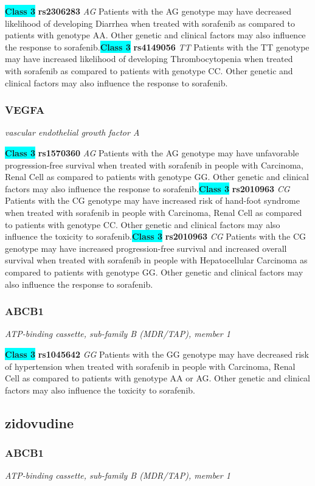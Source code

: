 \documentclass{report}
\begin{document}
\textbf{\colorbox{cyan} {Class 3}} \textbf{ rs2306283 } \textit{ AG }
Patients with the AG genotype may have decreased likelihood of developing Diarrhea when treated with sorafenib as compared to patients with genotype AA. Other genetic and clinical factors may also influence the response to sorafenib.\newline\textbf{\colorbox{cyan} {Class 3}} \textbf{ rs4149056 } \textit{ TT }
Patients with the TT genotype may have increased likelihood of developing Thrombocytopenia when treated with sorafenib as compared to patients with genotype CC. Other genetic and clinical factors may also influence the response to sorafenib.\newline\subsubsection{ VEGFA }
\textit{ vascular endothelial growth factor A }

\textbf{\colorbox{cyan} {Class 3}} \textbf{ rs1570360 } \textit{ AG }
Patients with the AG genotype may have unfavorable progression-free survival when treated with sorafenib in people with Carcinoma, Renal Cell as compared to patients with genotype GG. Other genetic and clinical factors may also influence the response to sorafenib.\newline\textbf{\colorbox{cyan} {Class 3}} \textbf{ rs2010963 } \textit{ CG }
Patients with the CG genotype may have increased risk of hand-foot syndrome when treated with sorafenib in people with Carcinoma, Renal Cell as compared to patients with genotype CC. Other genetic and clinical factors may also influence the toxicity to sorafenib.\newline\textbf{\colorbox{cyan} {Class 3}} \textbf{ rs2010963 } \textit{ CG }
Patients with the CG genotype may have increased progression-free survival and increased overall survival when treated with sorafenib in people with Hepatocellular Carcinoma as compared to patients with genotype GG. Other genetic and clinical factors may also influence the response to sorafenib.\newline\subsubsection{ ABCB1 }
\textit{ ATP-binding cassette, sub-family B (MDR/TAP), member 1 }

\textbf{\colorbox{cyan} {Class 3}} \textbf{ rs1045642 } \textit{ GG }
Patients with the GG genotype may have decreased risk of hypertension when treated with sorafenib in people with Carcinoma, Renal Cell as compared to patients with genotype AA or AG. Other genetic and clinical factors may also influence the toxicity to sorafenib.\newline\subsection{ zidovudine }\subsubsection{ ABCB1 }
\textit{ ATP-binding cassette, sub-family B (MDR/TAP), member 1 }
\end{document}
